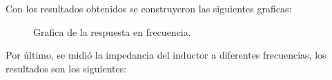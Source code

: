 \documentclass[12pt,a4paper]{article}
\newcounter{ns}
\begin{document}
	Con los resultados obtenidos se construyeron las siguientes graficas:\\
	
	\begin{figure}[h!]
		\centering
		\caption{Grafica de la respuesta en frecuencia.}
	\end{figure}
	
	Por último, se midió la impedancia del inductor a diferentes frecuencias, los resultados son los siguientes:
	
	\begin{figure}[h!]
		\centering
	\end{figure}
\end{document}

